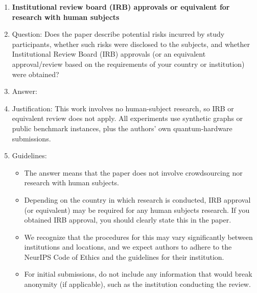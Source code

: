 \begin{enumerate}
\item {\bf Institutional review board (IRB) approvals or equivalent for research with human subjects}
    \item[] Question: Does the paper describe potential risks incurred by study participants, whether such risks were disclosed to the subjects, and whether Institutional Review Board (IRB) approvals (or an equivalent approval/review based on the requirements of your country or institution) were obtained?
    \item[] Answer: \answerNA{} %
    \item[] Justification: This work involves no human-subject research,
        so IRB or equivalent review does not apply. All experiments use
        synthetic graphs or public benchmark instances, plus the
        authors' own quantum-hardware submissions.
    \item[] Guidelines:
    \begin{itemize}
        \item The answer \answerNA{} means that the paper does not involve crowdsourcing nor research with human subjects.
        \item Depending on the country in which research is conducted, IRB approval (or equivalent) may be required for any human subjects research. If you obtained IRB approval, you should clearly state this in the paper.
        \item We recognize that the procedures for this may vary significantly between institutions and locations, and we expect authors to adhere to the NeurIPS Code of Ethics and the guidelines for their institution.
        \item For initial submissions, do not include any information that would break anonymity (if applicable), such as the institution conducting the review.
    \end{itemize}


\end{enumerate}
